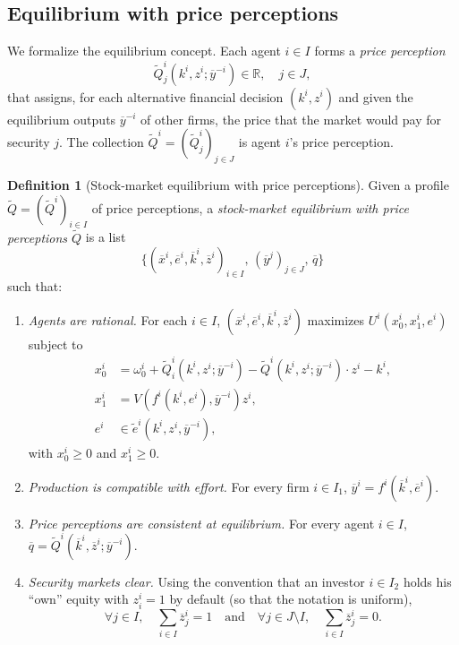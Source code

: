 \documentclass[11pt,a4paper,oneside]{book}
\def\R{\mathbb{R}}
\def\geq{\geqslant}
\def\et{\quad \text{and} \quad}
\theoremstyle{plain}
\theoremstyle{definition}
\newtheorem{definition}[theorem]{Definition}
\theoremstyle{remark}
\numberwithin{equation}{chapter}
\begin{document}
\subsection{Equilibrium with price perceptions}

We formalize the equilibrium concept.
Each agent $i \in I$ forms a \emph{price perception}
\begin{equation*}
  \widetilde{Q}^i_j(k^i, z^i; \overline{y}^{-i}) \in \R,
  \quad j \in J,
\end{equation*}
that assigns, for each alternative financial decision $(k^i, z^i)$ and given the equilibrium outputs $\overline{y}^{-i}$ of other firms, the price that the market would pay for security $j$.
The collection $\widetilde{Q}^i = (\widetilde{Q}^i_j)_{j \in J}$ is agent $i$'s price perception.

\begin{definition}[Stock-market equilibrium with price perceptions]\label{def:eq-PP}
Given a profile $\widetilde{Q} = (\widetilde{Q}^i)_{i \in I}$ of price perceptions, a \emph{stock-market equilibrium with price perceptions $\widetilde{Q}$} is a list
\begin{equation*}
  \bigl\{ (\overline{x}^i, \overline{e}^i, \overline{k}^i, \overline{z}^i)_{i \in I}, \, (\overline{y}^j)_{j \in J}, \, \overline{q} \bigr\}
\end{equation*}
such that:
\begin{enumerate}
  \item[(a)] \emph{Agents are rational.}
  For each $i \in I$, $(\overline{x}^i, \overline{e}^i, \overline{k}^i, \overline{z}^i)$ maximizes $U^i(x^i_0, x^i_1, e^i)$ subject to
  \begin{align*}
    x^i_0 &= \omega^i_0 + \widetilde{Q}^i_i(k^i, z^i; \overline{y}^{-i}) - \widetilde{Q}^i(k^i, z^i; \overline{y}^{-i}) \cdot z^i - k^i, \\
    x^i_1 &= V(f^i(k^i, e^i), \overline{y}^{-i}) z^i, \\
    e^i &\in \widetilde{e}^i(k^i, z^i, \overline{y}^{-i}),
  \end{align*}
  with $x^i_0 \geq 0$ and $x^i_1 \geq 0$.
  \item[(b)] \emph{Production is compatible with effort.}
  For every firm $i \in I_1$, $\overline{y}^i = f^i(\overline{k}^i, \overline{e}^i)$.
  \item[(c)] \emph{Price perceptions are consistent at equilibrium.}
  For every agent $i \in I$, $\overline{q} = \widetilde{Q}^i(\overline{k}^i, \overline{z}^i; \overline{y}^{-i})$.
  \item[(d)] \emph{Security markets clear.}
  Using the convention that an investor $i \in I_2$ holds his ``own'' equity with $z^i_i = 1$ by default (so that the notation is uniform),
  \begin{equation*}
    \forall j \in I, \quad \sum_{i \in I} \overline{z}^i_j = 1
    \et
    \forall j \in J \setminus I, \quad \sum_{i \in I} \overline{z}^i_j = 0.
  \end{equation*}
\end{enumerate}
\end{definition}
\end{document}
